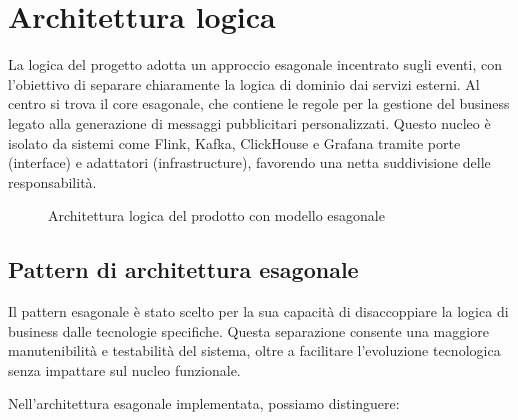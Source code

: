 \documentclass[10pt]{article}
\begin{document}
    \section{Architettura logica}

    La logica del progetto adotta un approccio esagonale incentrato sugli eventi, con l'obiettivo di separare chiaramente la logica di dominio dai servizi esterni. Al centro si trova il core esagonale, che contiene le regole per la gestione del business legato alla generazione di messaggi pubblicitari personalizzati. Questo nucleo è isolato da sistemi come Flink, Kafka, ClickHouse e Grafana tramite porte (interface) e adattatori (infrastructure), favorendo una netta suddivisione delle responsabilità.

    \begin{figure}[h]
    \centering
    \caption{Architettura logica del prodotto con modello esagonale}
    \end{figure}

    \subsection{Pattern di architettura esagonale}

    Il pattern esagonale è stato scelto per la sua capacità di disaccoppiare la logica di business dalle tecnologie specifiche. Questa separazione consente una maggiore manutenibilità e testabilità del sistema, oltre a facilitare l'evoluzione tecnologica senza impattare sul nucleo funzionale.

    Nell'architettura esagonale implementata, possiamo distinguere:
\end{document}
